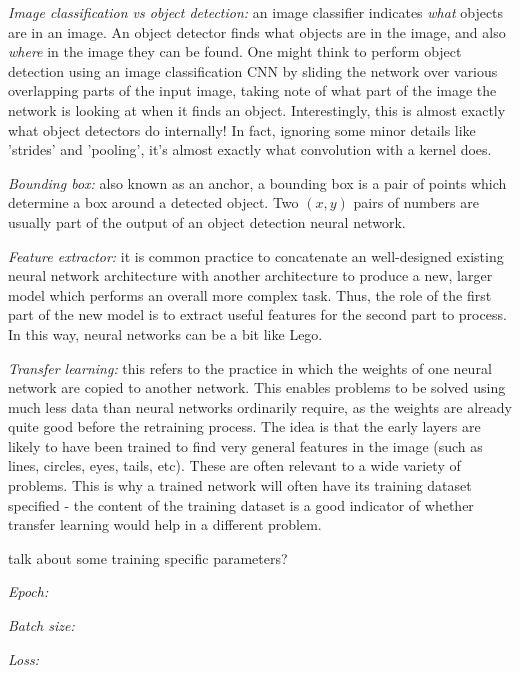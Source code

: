 \textit{Image classification vs object detection:} an image classifier indicates \emph{what} objects are in an image. An object detector finds what objects are in the image, and also \emph{where} in the image they can be found. One might think to perform object detection using an image classification CNN by sliding the network over various overlapping parts of the input image, taking note of what part of the image the network is looking at when it finds an object. Interestingly, this is almost exactly what object detectors do internally! In fact, ignoring some minor details like 'strides' and 'pooling', it's almost exactly what convolution with a kernel does.

\textit{Bounding box:} also known as an anchor, a bounding box is a pair of points which determine a box around a detected object. Two $(x, y)$ pairs of numbers are usually part of the output of an object detection neural network.

\textit{Feature extractor:} it is common practice to concatenate an well-designed existing neural network architecture with another architecture to produce a new, larger model which performs an overall more complex task. Thus, the role of the first part of the new model is to extract useful features for the second part to process. In this way, neural networks can be a bit like Lego.

\textit{Transfer learning:} this refers to the practice in which the weights of one neural network are copied to another network. This enables problems to be solved using much less data than neural networks ordinarily require, as the weights are already quite good before the retraining process. The idea is that the early layers are likely to have been trained to find very general features in the image (such as lines, circles, eyes, tails, etc). These are often relevant to a wide variety of problems. This is why a trained network will often have its training dataset specified - the content of the training dataset is a good indicator of whether transfer learning would help in a different problem.

{\Large \color{red} talk about some training specific parameters?}

\textit{Epoch:}

\textit{Batch size:}

\textit{Loss:}

